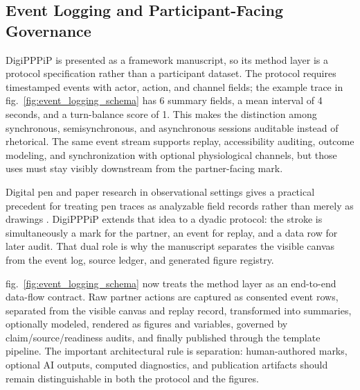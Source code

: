 \documentclass[
  english,
]{article}
\begin{document}
\subsection{Event Logging and Participant-Facing
Governance}\label{event-logging-and-participant-facing-governance}

DigiPPPiP is presented as a framework manuscript, so its method layer is
a protocol specification rather than a participant dataset. The protocol
requires timestamped events with actor, action, and channel fields; the
example trace in fig.~\ref{fig:event_logging_schema} has 6 summary
fields, a mean interval of 4 seconds, and a turn-balance score of 1.
This makes the distinction among synchronous, semisynchronous, and
asynchronous sessions auditable instead of rhetorical. The same event
stream supports replay, accessibility auditing, outcome modeling, and
synchronization with optional physiological channels, but those uses
must stay visibly downstream from the partner-facing mark.

Digital pen and paper research in observational settings gives a
practical precedent for treating pen traces as analyzable field records
rather than merely as drawings \citep{weibel2012digitalpen}. DigiPPPiP
extends that idea to a dyadic protocol: the stroke is simultaneously a
mark for the partner, an event for replay, and a data row for later
audit. That dual role is why the manuscript separates the visible canvas
from the event log, source ledger, and generated figure registry.

fig.~\ref{fig:event_logging_schema} now treats the method layer as an
end-to-end data-flow contract. Raw partner actions are captured as
consented event rows, separated from the visible canvas and replay
record, transformed into summaries, optionally modeled, rendered as
figures and variables, governed by claim/source/readiness audits, and
finally published through the template pipeline. The important
architectural rule is separation: human-authored marks, optional AI
outputs, computed diagnostics, and publication artifacts should remain
distinguishable in both the protocol and the figures.
\end{document}
